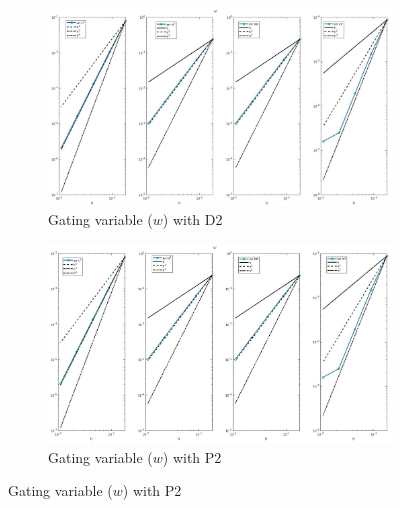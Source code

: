 \documentclass[a4paper,11pt]{article}
\begin{document}
\begin{figure}[H]
\caption{Comparison of the gating variable ($w$)}
\label{w_2}
\begin{subfigure}{\textwidth}
\begin{center}
\includegraphics[width = \textwidth]{./D2_w_1.jpg}
\caption{Gating variable ($w$) with D2}
\end{center}
\end{subfigure}
\begin{subfigure}{\textwidth}
\begin{center}
\includegraphics[width =\textwidth]{./P2_w_1.jpg}
\caption{Gating variable ($w$) with P2}
\end{center}
\end{subfigure}
\end{figure}
\end{document}
